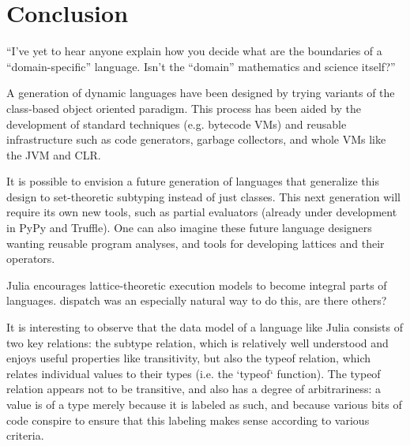 \chapter{Conclusion}





``I’ve yet to hear anyone explain how you decide what are the boundaries of a “domain-specific” language. Isn’t the “domain” mathematics and science itself?''~\cite{bobharperdsl}


A generation of dynamic languages have been designed by trying variants of
the class-based object oriented paradigm. This process has been aided by
the development of standard techniques (e.g. bytecode VMs) and reusable
infrastructure such as code generators, garbage collectors, and whole VMs
like the JVM and CLR.

It is possible to envision a future generation of languages that generalize
this design to set-theoretic subtyping instead of just classes. This next
generation will require its own new tools, such as partial evaluators (already
under development in PyPy and Truffle). One can also imagine these future
language designers wanting reusable program analyses, and tools for
developing lattices and their operators.

Julia encourages lattice-theoretic execution models to become integral
parts of languages. dispatch was an especially natural way to do this,
are there others?

It is interesting to observe that the data model of a language like Julia
consists of two key relations: the subtype relation, which is relatively
well understood and enjoys useful properties like transitivity, but also
the typeof relation, which relates individual values to their types
(i.e. the `typeof` function). The typeof relation appears not to be
transitive, and also has a degree of arbitrariness: a value is of a type
merely because it is labeled as such, and because various bits of code
conspire to ensure that this labeling makes sense according to various
criteria.

